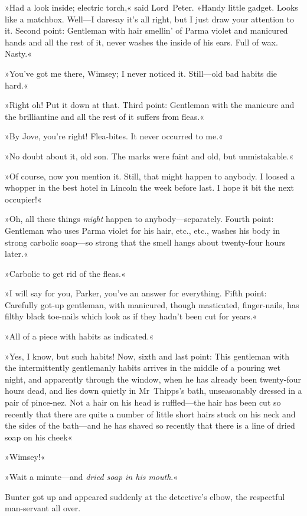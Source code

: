 »Had a look inside; electric torch,« said Lord~Peter. »Handy little gadget. Looks like a matchbox. Well—I daresay it's all right, but I just draw your attention to it. Second point: Gentleman with hair smellin' of Parma violet and manicured hands and all the rest of it, never washes the inside of his ears. Full of wax. Nasty.«

»You've got me there, Wimsey; I never noticed it. Still—old bad habits die hard.«

»Right oh! Put it down at that. Third point: Gentleman with the manicure and the brilliantine and all the rest of it suffers from fleas.«

»By Jove, you're right! Flea-bites. It never occurred to me.«

»No doubt about it, old son. The marks were faint and old, but unmistakable.«

»Of course, now you mention it. Still, that might happen to anybody. I loosed a whopper in the best hotel in Lincoln the week before last. I hope it bit the next occupier!«

»Oh, all these things \textit{might} happen to anybody—separately. Fourth point: Gentleman who uses Parma violet for his hair, etc., etc., washes his body in strong carbolic soap—so strong that the smell hangs about twenty-four hours later.«

»Carbolic to get rid of the fleas.«

»I will say for you, Parker, you've an answer for everything. Fifth point: Carefully got-up gentleman, with manicured, though masticated, finger-nails, has filthy black toe-nails which look as if they hadn't been cut for years.«

»All of a piece with habits as indicated.«

»Yes, I know, but such habits! Now, sixth and last point: This gentleman with the intermittently gentlemanly habits arrives in the middle of a pouring wet night, and apparently through the window, when he has already been twenty-four hours dead, and lies down quietly in Mr~Thipps's bath, unseasonably dressed in a pair of pince-nez. Not a hair on his head is ruffled—the hair has been cut so recently that there are quite a number of little short hairs stuck on his neck and the sides of the bath—and he has shaved so recently that there is a line of dried soap on his cheek\longdash«

»Wimsey!«

»Wait a minute—and \textit{dried soap in his mouth}.«

Bunter got up and appeared suddenly at the detective's elbow, the respectful man-servant all over.

